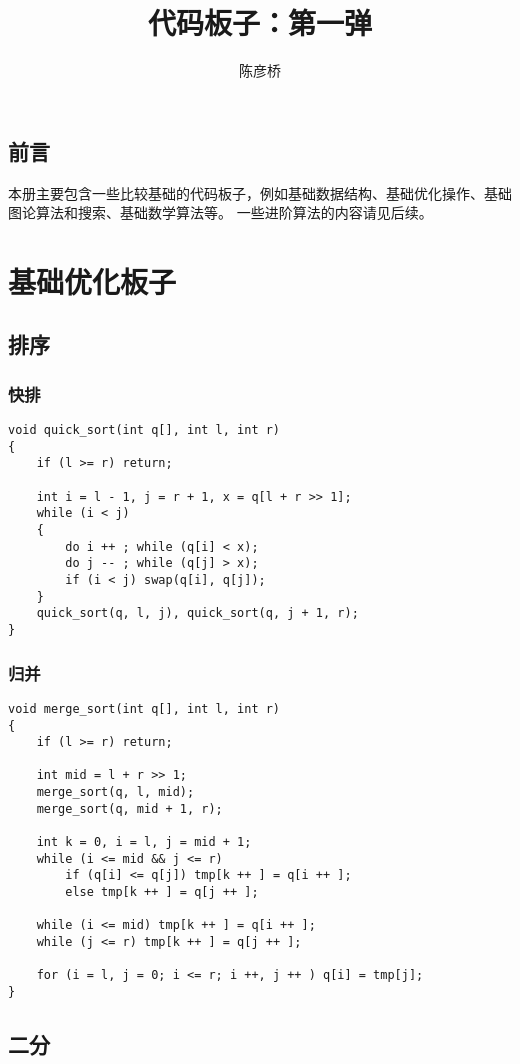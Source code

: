 \documentclass[12pt,a4paper,UTF16]{ctexbook}
\title{\bf{代码板子：第一弹}}
\author{陈彦桥}
\theoremstyle{plain}
\begin{document}
\maketitle

\section{前言}
本册主要包含一些比较基础的代码板子，例如基础数据结构、基础优化操作、基础图论算法和搜索、基础数学算法等。
一些进阶算法的内容请见后续。

\tableofcontents


\chapter{基础优化板子}
\section{排序}
\subsection{快排}
\begin{lstlisting}
void quick_sort(int q[], int l, int r)
{
    if (l >= r) return;

    int i = l - 1, j = r + 1, x = q[l + r >> 1];
    while (i < j)
    {
        do i ++ ; while (q[i] < x);
        do j -- ; while (q[j] > x);
        if (i < j) swap(q[i], q[j]);
    }
    quick_sort(q, l, j), quick_sort(q, j + 1, r);
}
\end{lstlisting}
\subsection{归并}
\begin{lstlisting}
void merge_sort(int q[], int l, int r)
{
    if (l >= r) return;

    int mid = l + r >> 1;
    merge_sort(q, l, mid);
    merge_sort(q, mid + 1, r);

    int k = 0, i = l, j = mid + 1;
    while (i <= mid && j <= r)
        if (q[i] <= q[j]) tmp[k ++ ] = q[i ++ ];
        else tmp[k ++ ] = q[j ++ ];

    while (i <= mid) tmp[k ++ ] = q[i ++ ];
    while (j <= r) tmp[k ++ ] = q[j ++ ];

    for (i = l, j = 0; i <= r; i ++, j ++ ) q[i] = tmp[j];
}
\end{lstlisting}

\section{二分}
\end{document}
